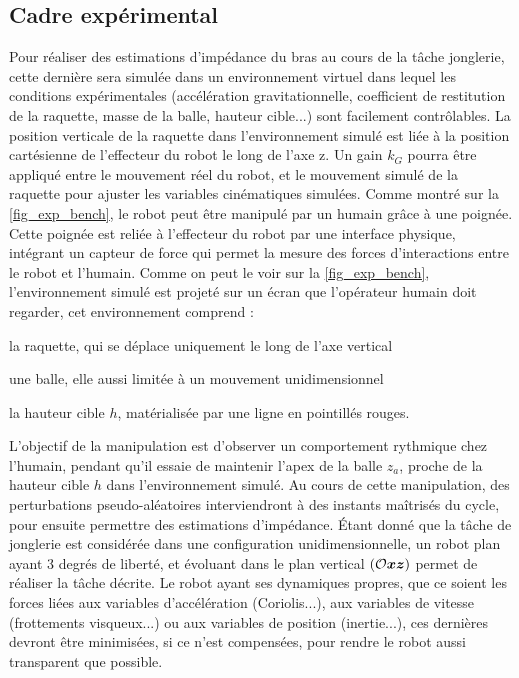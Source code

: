 \documentclass[12pt, a4paper]{article} %
\numberwithin{equation}{section}
\begin{document}
\subsection{Cadre expérimental} \label{sec_bouncing_sub_experiment}

Pour réaliser des estimations d'impédance du bras au cours de la tâche jonglerie, cette dernière sera simulée dans un environnement virtuel dans lequel les conditions expérimentales (accélération gravitationnelle, coefficient de restitution de la raquette, masse de la balle, hauteur cible...) sont facilement contrôlables.
%
\newlineBlank
%
La position verticale de la raquette dans l'environnement simulé est liée à la position cartésienne de l'effecteur du robot le long de l'axe z. Un gain $ k_G $ pourra être appliqué entre le mouvement réel du robot, et le mouvement simulé de la raquette pour ajuster les variables cinématiques simulées. Comme montré sur la \cref{fig_exp_bench}, le robot peut être manipulé par un humain grâce à une poignée. Cette poignée est reliée à l'effecteur du robot par une interface physique, intégrant un capteur de force qui permet la mesure des forces d'interactions entre le robot et l'humain.
%
\newlineBlank
%
Comme on peut le voir sur la \cref{fig_exp_bench}, l'environnement simulé est projeté sur un écran que l'opérateur humain doit regarder, cet environnement comprend : 
\begin{enumerate*}[label=\roman*),itemjoin={,\quad}] 
	\item la raquette, qui se déplace uniquement le long de l'axe vertical
	\item une balle, elle aussi limitée à un mouvement unidimensionnel
	\item la hauteur cible $h$, matérialisée par une ligne en pointillés rouges.
\end{enumerate*} 
%
\newlineBlank
%


L'objectif de la manipulation est d'observer un comportement rythmique chez l'humain, pendant qu'il essaie de maintenir l'apex de la balle $ z_a $, proche de la hauteur cible $ h $ dans l'environnement simulé. Au cours de cette manipulation, des perturbations pseudo-aléatoires interviendront à des instants maîtrisés du cycle, pour ensuite permettre des estimations d'impédance.
%
\newlineBlank
%
Étant donné que la tâche de jonglerie est considérée dans une configuration unidimensionnelle, un robot plan ayant 3 degrés de liberté, et évoluant dans le plan vertical $ (\mathcal{O}\vect{x}\vect{z}) $ permet de réaliser la tâche décrite. Le robot ayant ses dynamiques propres, que ce soient les forces liées aux variables d'accélération (Coriolis...), aux variables de vitesse (frottements visqueux...) ou aux variables de position (inertie...), ces dernières devront être minimisées, si ce n'est compensées, pour rendre le robot aussi transparent que possible.
\end{document}
